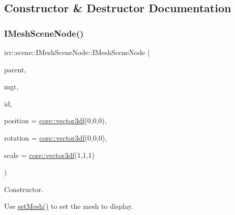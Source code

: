 \subsection{Constructor \& Destructor Documentation}
\mbox{\label{classirr_1_1scene_1_1IMeshSceneNode_a491d6cac4ec270ab01c24e27c88e6ca4}} 
\subsubsection{\texorpdfstring{I\+Mesh\+Scene\+Node()}{IMeshSceneNode()}\hspace{0.1cm}{\footnotesize\ttfamily [1/2]}}
{\footnotesize\ttfamily irr\+::scene\+::\+I\+Mesh\+Scene\+Node\+::\+I\+Mesh\+Scene\+Node (\begin{DoxyParamCaption}\item[{\hyperlink{classirr_1_1scene_1_1ISceneNode}{I\+Scene\+Node} $\ast$}]{parent,  }\item[{\hyperlink{classirr_1_1scene_1_1ISceneManager}{I\+Scene\+Manager} $\ast$}]{mgr,  }\item[{\hyperlink{namespaceirr_ac66849b7a6ed16e30ebede579f9b47c6}{s32}}]{id,  }\item[{const \hyperlink{namespaceirr_1_1core_ae6e2b2a6c552833ebbd5b7463d03586b}{core\+::vector3df} \&}]{position = {\ttfamily \hyperlink{namespaceirr_1_1core_ae6e2b2a6c552833ebbd5b7463d03586b}{core\+::vector3df}(0,0,0)},  }\item[{const \hyperlink{namespaceirr_1_1core_ae6e2b2a6c552833ebbd5b7463d03586b}{core\+::vector3df} \&}]{rotation = {\ttfamily \hyperlink{namespaceirr_1_1core_ae6e2b2a6c552833ebbd5b7463d03586b}{core\+::vector3df}(0,0,0)},  }\item[{const \hyperlink{namespaceirr_1_1core_ae6e2b2a6c552833ebbd5b7463d03586b}{core\+::vector3df} \&}]{scale = {\ttfamily \hyperlink{namespaceirr_1_1core_ae6e2b2a6c552833ebbd5b7463d03586b}{core\+::vector3df}(1,1,1)} }\end{DoxyParamCaption})\hspace{0.3cm}{\ttfamily [inline]}}



Constructor. 

Use \hyperlink{classirr_1_1scene_1_1IMeshSceneNode_a8d7e98ddfb990bfc354c9c410a4d788f}{set\+Mesh()} to set the mesh to display. \mbox{\label{classirr_1_1scene_1_1IMeshSceneNode_a491d6cac4ec270ab01c24e27c88e6ca4}} 
